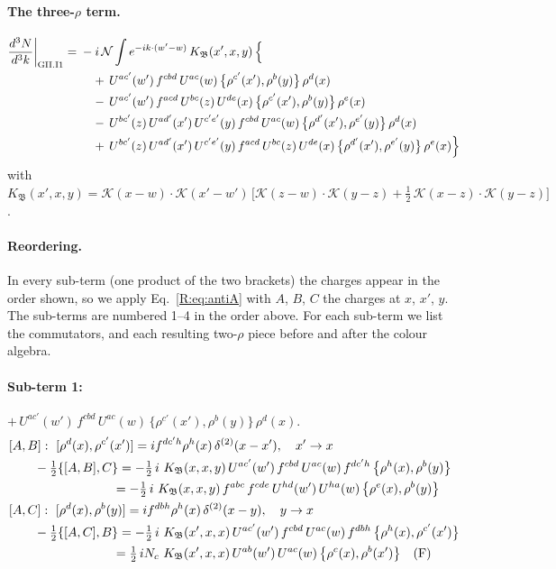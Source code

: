 \documentclass[10pt]{article}
\numberwithin{equation}{section}
\newcommand{\KK}{\mathcal K}
\newcommand{\NN}{\mathcal N}
\begin{document}
\paragraph{The three-$\rho$ term.}
\begin{align}
\frac{d^3N}{d^3k}\bigg|_{\rm GII.I1}={}&-i\,\NN\int e^{-ik\cdot(w'-w)}\,K_{\mathfrak B}(x',x,y)\,\Big\{\notag\\
&\quad +\,U^{ac'}(w')\,f^{cbd}\,U^{ac}(w)\,\big\{\rho^{c'}(x'),\rho^{b}(y)\big\}\,\rho^{d}(x)\notag\\
&\quad -\,U^{ac'}(w')\,f^{acd}\,U^{bc}(z)\,U^{de}(x)\,\big\{\rho^{c'}(x'),\rho^{b}(y)\big\}\,\rho^{e}(x)\notag\\
&\quad -\,U^{bc'}(z)\,U^{ad'}(x')\,U^{c'e'}(y)\,f^{cbd}\,U^{ac}(w)\,\big\{\rho^{d'}(x'),\rho^{e'}(y)\big\}\,\rho^{d}(x)\notag\\
&\quad +\,U^{bc'}(z)\,U^{ad'}(x')\,U^{c'e'}(y)\,f^{acd}\,U^{bc}(z)\,U^{de}(x)\,\big\{\rho^{d'}(x'),\rho^{e'}(y)\big\}\,\rho^{e}(x)\Big\}\label{R:eq:in-GII.I1}
\end{align}
with $K_{\mathfrak B}(x',x,y)=\KK(x-w)\cdot\KK(x'-w')\,\Big[\KK(z-w)\cdot\KK(y-z)+\tfrac12\,\KK(x-z)\cdot\KK(y-z)\Big]$.
\paragraph{Reordering.} In every sub-term (one product of the two brackets) the charges appear in the order shown, so we apply Eq.~\eqref{R:eq:antiA} with $A$, $B$, $C$ the charges at $x$, $x'$, $y$. The sub-terms are numbered 1--4 in the order above. For each sub-term we list the commutators, and each resulting two-$\rho$ piece before and after the colour algebra.
\paragraph{Sub-term 1:} $+\,U^{ac'}(w')\,f^{cbd}\,U^{ac}(w)\,\big\{\rho^{c'}(x'),\rho^{b}(y)\big\}\,\rho^{d}(x)$.
\begin{align}
&[A,B]:\ [\rho^{d}(x),\rho^{c'}(x')]=i f^{dc'h}\rho^{h}(x)\,\delta^{(2)}(x-x'),\quad x'\to x\notag\\
&\qquad -\tfrac12\{[A,B],C\}=-\tfrac12\,i\,\,K_{\mathfrak B}(x,x,y)\,U^{ac'}(w')\,f^{cbd}\,U^{ac}(w)\,f^{dc'h}\,\big\{\rho^{h}(x),\rho^{b}(y)\big\}\notag\\
&\qquad\phantom{-\tfrac12\{[A,B],C\}}=-\tfrac12\,i\,\,K_{\mathfrak B}(x,x,y)\,f^{abc}\,f^{cde}\,U^{hd}(w')\,U^{ha}(w)\,\big\{\rho^{e}(x),\rho^{b}(y)\big\}
\label{R:eq:GII.I1-1-AB}\\
&[A,C]:\ [\rho^{d}(x),\rho^{b}(y)]=i f^{dbh}\rho^{h}(x)\,\delta^{(2)}(x-y),\quad y\to x\notag\\
&\qquad -\tfrac12\{[A,C],B\}=-\tfrac12\,i\,\,K_{\mathfrak B}(x',x,x)\,U^{ac'}(w')\,f^{cbd}\,U^{ac}(w)\,f^{dbh}\,\big\{\rho^{h}(x),\rho^{c'}(x')\big\}\notag\\
&\qquad\phantom{-\tfrac12\{[A,C],B\}}=\tfrac12\,i N_{c}\,\,K_{\mathfrak B}(x',x,x)\,U^{ab}(w')\,U^{ac}(w)\,\big\{\rho^{c}(x),\rho^{b}(x')\big\}\quad\text{(F)}
\label{R:eq:GII.I1-1-AC}
\end{align}
\end{document}
